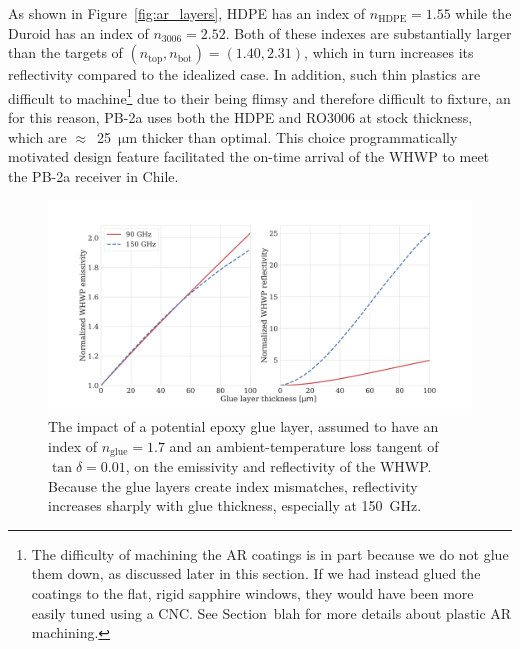 \begin{figure}[!t]
    \label{fig:pb2a_whwp_ar_layers}
\end{figure}

As shown in Figure~\ref{fig:ar_layers}, HDPE has an index of $n_{\mathrm{HDPE}} = 1.55$ while the Duroid has an index of $n_{\mathrm{3006}} = 2.52$. Both of these indexes are substantially larger than the targets of $(n_{\mathrm{top}}, n_{\mathrm{bot}}) = (1.40, 2.31)$, which in turn increases its reflectivity compared to the idealized case. In addition, such thin plastics are difficult to machine\footnote{The difficulty of machining the AR coatings is in part because we do not glue them down, as discussed later in this section. If we had instead glued the coatings to the flat, rigid sapphire windows, they would have been more easily tuned using a CNC. See Section~blah for more details about plastic AR machining.} due to their being flimsy and therefore difficult to fixture, an for this reason, PB-2a uses both the HDPE and RO3006 at stock thickness, which are $\approx$~25~$\mathrm{\mu m}$ thicker than optimal. This choice programmatically motivated design feature facilitated the on-time arrival of the WHWP to meet the PB-2a receiver in Chile.

\begin{figure}[!t]
    \centering
    \includegraphics[width=\linewidth, trim=3cm 1cm 3cm 3cm, clip]{PB2aWHWP/Figures/pb2a_whwp_glue_layer_impact.pdf}
    \caption[Impact of a potential glue layer on PB-2a WHWP emissivity and reflectivity.]{The impact of a potential epoxy glue layer, assumed to have an index of $n_{\mathrm{glue}} = 1.7$ and an ambient-temperature loss tangent of $\tan \delta = 0.01$, on the emissivity and reflectivity of the WHWP. Because the glue layers create index mismatches, reflectivity increases sharply with glue thickness, especially at 150~GHz.}
    \label{fig:pb2a_whwp_glue_layer_impact}
\end{figure}

